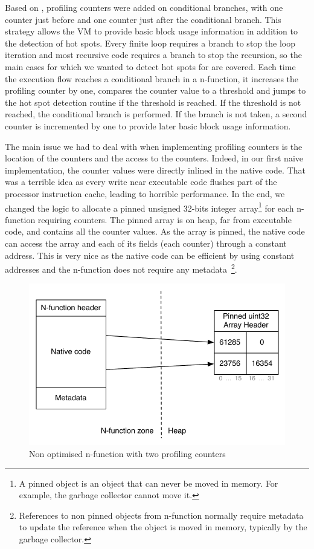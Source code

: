 \documentclass[a4paper,12pt,twoside]{../includes/ThesisStyle}
\begin{document}
Based on \cite{Arn02}, profiling counters were added on conditional branches, with one counter just before and one counter just after the conditional branch. This strategy allows the VM to provide basic block usage information in addition to the detection of hot spots. Every finite loop requires a branch to stop the loop iteration and most recursive code requires a branch to stop the recursion, so the main cases for which we wanted to detect hot spots for are covered. Each time the execution flow reaches a conditional branch in a n-function, it increases the profiling counter by one, compares the counter value to a threshold and jumps to the hot spot detection routine if the threshold is reached. If the threshold is not reached, the conditional branch is performed. If the branch is not taken, a second counter is incremented by one to provide later basic block usage information.

The main issue we had to deal with when implementing profiling counters is the location of the counters and the access to the counters. Indeed, in our first naive implementation, the counter values were directly inlined in the native code. That was a terrible idea as every write near executable code flushes part of the processor instruction cache, leading to horrible performance. In the end, we changed the logic to allocate a pinned unsigned 32-bits integer array\footnote{A pinned object is an object that can never be moved in memory. For example, the garbage collector cannot move it.} for each n-function requiring counters. The pinned array is on heap, far from executable code, and contains all the counter values. As the array is pinned, the native code can access the array and each of its fields (each counter) through a constant address. This is very nice as the native code can be efficient by using constant addresses and the n-function does not require any metadata~\footnote{References to non pinned objects from n-function normally require metadata to update the reference when the object is moved in memory, typically by the garbage collector.}.

\begin{figure}[h!]
    \begin{center}
        \includegraphics[width=0.8\linewidth]{ProfilingCounters}
        \caption{Non optimised n-function with two profiling counters}
        \label{fig:ProfilingCounters}
    \end{center}
\end{figure}
\end{document}
